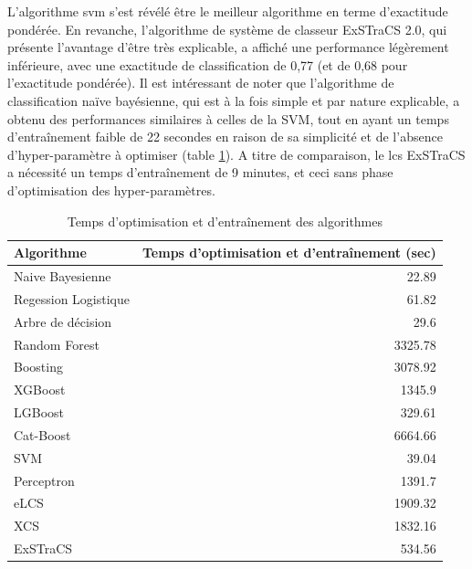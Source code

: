 L'algorithme \gls{svm} s'est révélé être le meilleur algorithme en terme d'exactitude pondérée. En revanche, l'algorithme de système de classeur ExSTraCS 2.0, qui présente l'avantage d'être très explicable, a affiché une performance légèrement inférieure, avec une exactitude de classification de 0,77 (et de 0,68 pour l'exactitude pondérée). Il est intéressant de noter que l'algorithme de classification naïve bayésienne, qui est à la fois simple et par nature explicable, a obtenu des performances similaires à celles de la SVM, tout en ayant un temps d'entraînement faible de 22 secondes en raison de sa simplicité et de l'absence d'hyper-paramètre à optimiser (table \ref{tab:pipeline_times}). A titre de comparaison, le \gls{lcs} ExSTraCS a nécessité un temps d'entraînement de  9 minutes, et ceci sans phase d'optimisation des hyper-paramètres.
\begin{table}[htbp]
    \centering
    \begin{tabular}{lr}
        \toprule
        Algorithme & Temps d'optimisation et d'entraînement (sec) \\
        \midrule
        Naive Bayesienne & 22.89 \\
        Regession Logistique & 61.82 \\
        Arbre de décision & 29.6 \\
        Random Forest & 3325.78 \\
        Boosting & 3078.92 \\
        XGBoost & 1345.9 \\
        LGBoost & 329.61 \\
        Cat-Boost & 6664.66 \\
        SVM & 39.04 \\
        Perceptron & 1391.7 \\
        eLCS & 1909.32 \\
        XCS & 1832.16 \\
        ExSTraCS & 534.56 \\
        \bottomrule
    \end{tabular}
    \caption{Temps d'optimisation et d'entraînement des algorithmes}
    \label{tab:pipeline_times}
\end{table}
